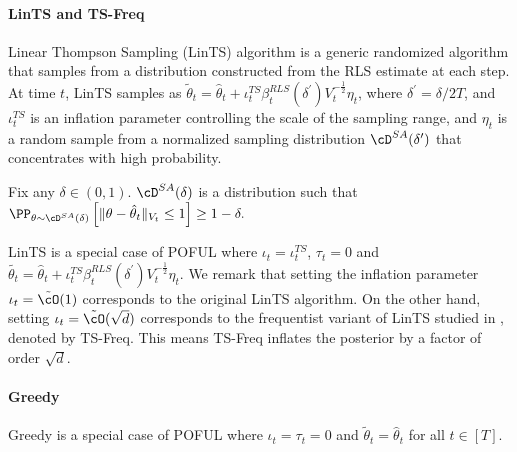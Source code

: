 \paragraph{LinTS and TS-Freq}	
Linear Thompson Sampling (LinTS) algorithm is a generic randomized algorithm that samples from a distribution constructed from the RLS estimate at each step. At time $t$, LinTS samples as $\tilde{\theta}_{t}  =\hat{\theta}_t +\iota^{TS}_t \beta_t^{RLS} (\delta^\prime) V_t^{-\frac{1}{2}} \eta_t$, where $\delta^\prime = \delta/2T$, and $\iota^{TS}_t$ is an inflation parameter controlling the scale of the sampling range, and $\eta_t$ is a random sample from a normalized sampling distribution $\cD^{SA}(\delta^\prime)$ that concentrates with high probability. 


\begin{definition}
	 Fix any $\delta \in (0,1)$. $\cD^{SA} (\delta) $  is a distribution such that $
	\PP_{\theta \sim \cD^{SA}(\delta)}\left[\|\theta - \hparam_t\|_{V_t} \leq 1\right] \geq 1 - \delta.
	$
	\end{definition}
LinTS is a special case of POFUL where  $\iota_t = \iota^{TS}_t$, $\tau_t = 0$ and $\tilde{\theta_t} = \hat{\theta}_t +\iota^{TS}_t \beta_t^{RLS} (\delta^\prime) V_t^{-\frac{1}{2}} \eta_t$. We remark that setting the inflation parameter $\iota_t = \tilde{\cO}(1)$ corresponds to the original LinTS algorithm. On the other hand,  setting $\iota_t= \tilde{\cO}(\sqrt{d})$  corresponds to the frequentist variant of LinTS studied in \cite{agrawal2013thompson,abeille2017linear}, denoted by TS-Freq. This means TS-Freq inflates the posterior by a factor of order $\sqrt{d}$.
\paragraph{Greedy} Greedy is a special case of POFUL where $\iota_t = \tau_t = 0$ and $\tilde{\theta}_t = \hat{\theta}_t$  for all $t\in[T]$.


